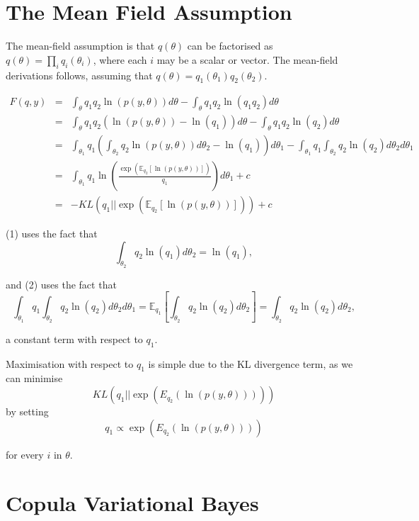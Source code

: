 \documentclass[12pt]{article}\usepackage[]{graphicx}\usepackage[]{color}
\begin{document}
\section{The Mean Field Assumption}
The mean-field assumption is that $q(\theta)$ can be factorised as $q(\theta) = \prod_{i} q_{i}(\theta_{i})$, where each $i$ may be a scalar or vector.
The mean-field derivations follows, assuming that $q(\theta) = q_{1}(\theta_{1}) q_{2}(\theta_{2})$. 

\begin{eqnarray}
F(q, y) & = &\int_{\theta} q_{1}q_{2} \ln (p(y, \theta)) d\theta - \int_{\theta} q_{1}q_{2} \ln (q_{1}q_{2}) d\theta \nonumber \\
& = & \int_{\theta} q_{1}q_{2} ( \ln (p(y, \theta)) - \ln(q_{1})) d\theta - \int_{\theta} q_{1}q_{2} \ln (q_{2}) d\theta \\
& = & \int_{\theta_{1}} q_{1} \left( \int_{\theta_{2}} q_{2} \ln (p(y, \theta )) d\theta_{2}- \ln(q_{1}) \right) d\theta_{1} - \int_{\theta_{1}} q_{1} \int_{\theta_{2}} q_{2} \ln(q_{2}) d\theta_{2} d\theta_{1} \nonumber \\
& = & \int_{\theta_{1}} q_{1} \ln \left( \frac{\exp(  \mathbb{E}_{q_2} [\ln(p(y,\theta))])}{q_{1}} \right) d\theta_{1} + c \\
& = & -KL (q_{1} || \exp( \mathbb{E}_{q_2} [\ln(p(y,\theta))])) + c \nonumber
\end{eqnarray}

(1) uses the fact that
$$ \int_{\theta_{2}} q_{2} \ln(q_{1}) d\theta_{2} = \ln(q_{1}),$$

and (2) uses the fact that
$$ \int_{\theta_{1}} q_{1} \int_{\theta_{2}} q_{2} \ln(q_{2}) d\theta_{2} d\theta_{1} = \mathbb{E}_{q_1}\left[  \int_{\theta_{2}} q_{2} \ln(q_{2}) d\theta_{2}\right] =  \int_{\theta_{2}} q_{2} \ln(q_{2}) d\theta_{2}, $$

a constant term with respect to $q_{1}$.

Maximisation with respect to $q_{1}$ is simple due to the KL divergence term, as we can minimise 
$$KL (q_{1} || \exp(E_{q_{2}} (\ln(p(y,\theta)))))$$
by setting 
$$q_{1} \propto \exp(E_{q_{2}} (\ln(p(y,\theta))))$$

for every $i$ in $\theta$.

\section{Copula Variational Bayes}
\end{document}
